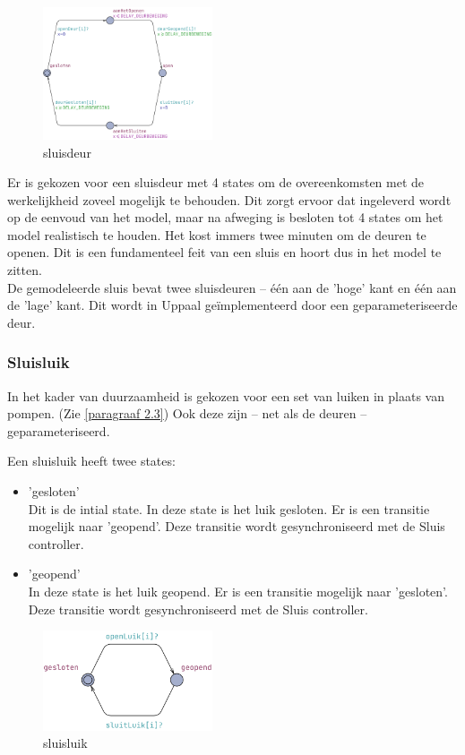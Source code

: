 \documentclass{article} %
\begin{document}
\begin{figure}[h]
    \includegraphics[width=5cm]{sluisdeur.png}
    \centering    
    \caption{sluisdeur}
\end{figure}

Er is gekozen voor een sluisdeur met 4 states om de overeenkomsten met de werkelijkheid zoveel mogelijk te behouden. Dit zorgt ervoor dat ingeleverd wordt op de eenvoud van het model, maar na afweging is besloten tot 4 states om het model realistisch te houden. Het kost immers twee minuten om de deuren te openen. Dit is een fundamenteel feit van een sluis en hoort dus in het model te zitten. \\
De gemodeleerde sluis bevat twee sluisdeuren -- één aan de 'hoge' kant en één aan de 'lage' kant. Dit wordt in Uppaal geïmplementeerd door een geparameteriseerde deur.

\newpage

\subsubsection{Sluisluik}
In het kader van duurzaamheid is gekozen voor een set van luiken in plaats van pompen. (Zie \ref{paragraaf 2.3}) Ook deze zijn -- net als de deuren -- geparameteriseerd. \par
Een sluisluik heeft twee states:

\begin{itemize}
    \item 'gesloten' \\
    Dit is de intial state. In deze state is het luik gesloten. Er is een transitie mogelijk naar 'geopend'. Deze transitie wordt gesynchroniseerd met de Sluis controller.
    \item 'geopend' \\
    In deze state is het luik geopend. Er is een transitie mogelijk naar 'gesloten'. Deze transitie wordt gesynchroniseerd met de Sluis controller.
\end{itemize}

\begin{figure}[h]
    \includegraphics[width=5cm]{sluisluik.png}
    \centering    
    \caption{sluisluik}
\end{figure}
\end{document}
